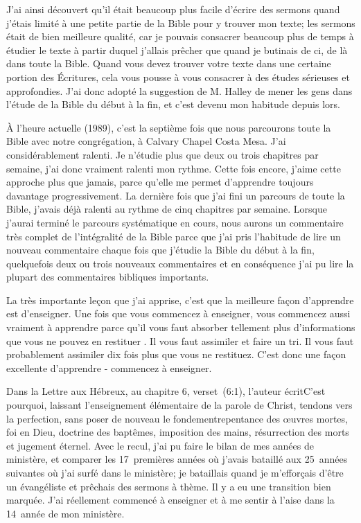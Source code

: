 J'ai ainsi découvert qu’il était beaucoup plus facile d’écrire des sermons quand j’étais limité à une petite partie de la
Bible pour y trouver mon texte; les sermons était de bien meilleure qualité, car je pouvais consacrer beaucoup plus de
temps à étudier le texte à partir duquel j’allais prêcher que quand je butinais de ci, de là dans toute la Bible. Quand
vous devez trouver votre texte dans une certaine portion des Écritures, cela vous pousse à vous consacrer à des
études sérieuses et approfondies. J’ai donc adopté la suggestion de M. Halley de mener les gens dans l'étude de la
Bible du début à la fin, et c’est devenu mon habitude depuis lors.

À l’heure actuelle (1989), c'est la septième fois que nous parcourons toute la Bible avec notre congrégation, à Calvary
Chapel Costa Mesa. J’ai considérablement ralenti. Je n’étudie plus que deux ou trois chapitres par semaine, j’ai donc
vraiment ralenti mon rythme. Cette fois encore, j’aime cette approche plus que jamais, parce qu'elle me permet
d'apprendre toujours davantage progressivement. La dernière fois que j’ai fini un parcours de toute la Bible, j'avais
déjà ralenti au rythme de cinq chapitres par semaine. Lorsque j’aurai terminé le parcours systématique en cours,
nous aurons un commentaire très complet de l’intégralité de la Bible parce que j’ai pris l’habitude de lire un nouveau
commentaire chaque fois que j’étudie la Bible du début à la fin, quelquefois deux ou trois nouveaux commentaires et
en conséquence j’ai pu lire la plupart des commentaires bibliques importants.

La très importante leçon que j’ai apprise, c’est que la meilleure façon d’apprendre est d’enseigner. Une fois que vous
commencez à enseigner, vous commencez aussi vraiment à apprendre parce qu’il vous faut absorber tellement plus
d’informations que vous ne pouvez en restituer . Il vous faut assimiler et faire un tri. Il vous faut probablement
assimiler dix fois plus que vous ne restituez. C’est donc une façon excellente d’apprendre - commencez à enseigner.

Dans la Lettre aux Hébreux, au chapitre 6, verset~(6:1), l’auteur écrit\frcolon\og C’est pourquoi, laissant l’enseignement
élémentaire de la parole de Christ, tendons vers la perfection, sans poser de nouveau le fondement\frcolon repentance des
œuvres mortes, foi en Dieu, doctrine des baptêmes, imposition des mains, résurrection des morts et jugement
éternel.\fg{} Avec le recul, j'ai pu faire le bilan de mes années de ministère, et comparer les 17~premières années où
j'avais \og bataillé \fg{} aux 25~années suivantes où j'ai \og surfé \fg{} dans le ministère; je \og bataillais \fg{} quand je m'efforçais d’être un
évangéliste et prêchais des sermons à thème. Il y a eu une transition bien marquée. J’ai réellement commencé à
enseigner et à me sentir à l’aise dans la 14~année de mon ministère.

